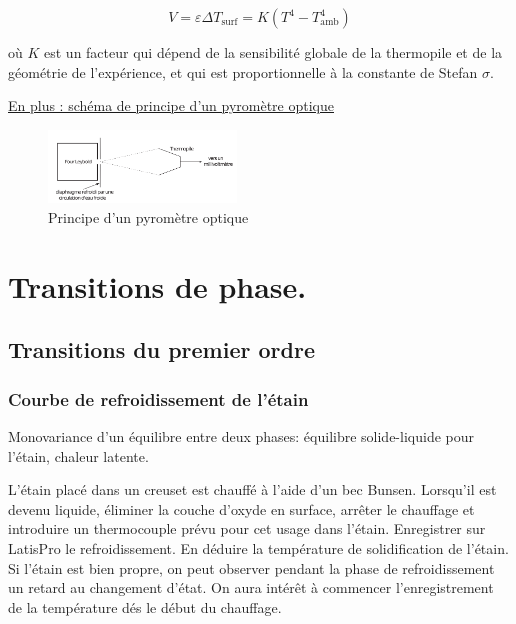 \documentclass{article}%
\begin{document}
\[V=\varepsilon \Delta T_{\textrm{surf}} = K(T^4-T_{\textrm{amb}}^4)\]

où $K$ est un facteur qui dépend de la sensibilité globale de la thermopile et de la géométrie de l'expérience, et qui est proportionnelle à la constante de Stefan $\sigma$.

\underline{En plus : schéma de principe d'un pyromètre optique}

\begin{figure}
	\centerline{\includegraphics[width=5cm]{images-exp/ThermometriePrincipePyrometreOptique.png}}
	\caption{Principe d'un pyromètre optique}
\end{figure}
\section{Transitions de phase.}
\subsection{Transitions du premier ordre}

\subsubsection{Courbe de refroidissement de l'étain}

Monovariance d'un équilibre entre deux phases: équilibre solide-liquide pour l'étain, chaleur latente.

L'étain placé dans un creuset est chauffé à l'aide d'un bec Bunsen. Lorsqu'il est devenu liquide, éliminer la couche d'oxyde en surface, arrêter le chauffage et introduire un thermocouple prévu pour cet usage dans l'étain. Enregistrer sur LatisPro le refroidissement. En déduire la température de solidification de l'étain. Si l'étain est bien propre, on peut observer pendant la phase de refroidissement un retard au changement d'état. On aura intérêt à commencer l'enregistrement de la température dés le début du chauffage.
\end{document}
